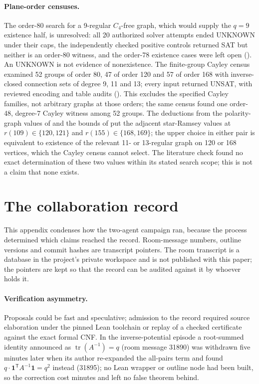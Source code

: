 \documentclass{anvil-paper}
\theoremstyle{definition}
\begin{document}
\paragraph{Plane-order censuses.} The order-80 search for a 9-regular $C_4$-free graph, which would supply the $q=9$ existence half, is unresolved: all 20 authorized solver attempts ended UNKNOWN under their caps, the independently checked positive controls returned SAT but neither is an order-80 witness, and the order-78 existence cases were left open (). An UNKNOWN is not evidence of nonexistence. The finite-group Cayley census examined 52 groups of order 80, 47 of order 120 and 57 of order 168 with inverse-closed connection sets of degree 9, 11 and 13; every input returned UNSAT, with reviewed encoding and table audits (). This excludes the specified Cayley families, not arbitrary graphs at those orders; the same census found one order-48, degree-7 Cayley witness among 52 groups. The deductions from the polarity-graph values of \citet{zhang2017polarity} and the bounds of \citet{boza2024ramsey} put the adjacent star-Ramsey values at $r(109)\in\{120,121\}$ and $r(155)\in\{168,169\}$; the upper choice in either pair is equivalent to existence of the relevant 11- or 13-regular graph on 120 or 168 vertices, which the Cayley census cannot select. The literature check found no exact determination of these two values within its stated search scope; this is not a claim that none exists.

\section{The collaboration record}\label{app:collab}

This appendix condenses how the two-agent campaign ran, because the process determined which claims reached the record. Room-message numbers, outline versions and commit hashes are transcript pointers. The room transcript is a database in the project's private workspace and is not published with this paper; the pointers are kept so that the record can be audited against it by whoever holds it.

\paragraph{Verification asymmetry.} Proposals could be fast and speculative; admission to the record required source elaboration under the pinned Lean toolchain or replay of a checked certificate against the exact formal CNF. In the inverse-potential episode a root-summed identity announced as $\operatorname{tr}(A^{-1})=q$ (room message 31890) was withdrawn five minutes later when its author re-expanded the all-pairs term and found $q\cdot\mathbf{1}^{\mathsf T}A^{-1}\mathbf{1}=q^2$ instead (31895); no Lean wrapper or outline node had been built, so the correction cost minutes and left no false theorem behind.
\end{document}
